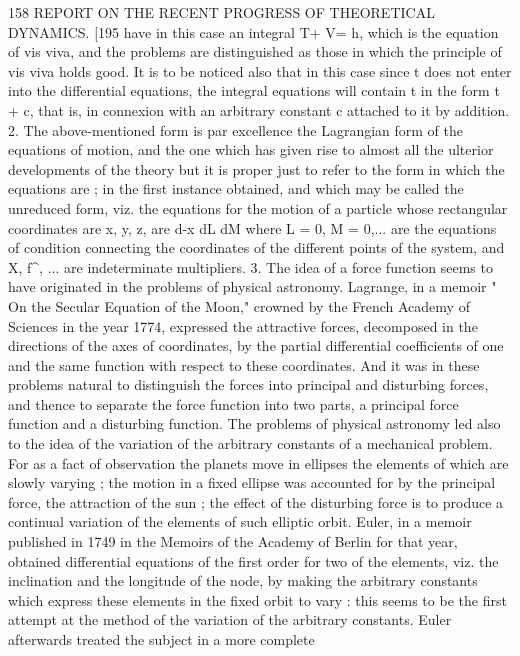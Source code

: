 \documentclass[11pt,a4paper]{book}
\begin{document}

158 REPORT ON THE RECENT PROGRESS OF THEORETICAL DYNAMICS.
[195
have in this case an integral T+ V= h, which is the equation of vis viva, and the
problems are distinguished as those in which the principle of vis viva holds good. It
is to be noticed also that in this case since t does not enter into the differential
equations, the integral equations will contain t in the form t + c, that is, in connexion
with an arbitrary constant c attached to it by addition.
2. The above-mentioned form is par excellence the Lagrangian form of the equations
of motion, and the one which has given rise to almost all the ulterior developments
of the theory but it is proper just to refer to the form in which the equations are
;
in the first instance obtained, and which may be called the unreduced form, viz. the
equations for the motion of a particle whose rectangular coordinates are x, y, z, are
d-x dL dM
where L = 0, M = 0,... are the equations of condition connecting the coordinates of the
different points of the system, and X, f^, ... are indeterminate multipliers.
3. The idea of a force function seems to have originated in the problems of
physical astronomy. Lagrange, in a memoir " On the Secular Equation of the Moon,"
crowned by the French Academy of Sciences in the year 1774, expressed the attractive
forces, decomposed in the directions of the axes of coordinates, by the partial differential
coefficients of one and the same function with respect to these coordinates. And it
was in these problems natural to distinguish the forces into principal and disturbing
forces, and thence to separate the force function into two parts, a principal force
function and a disturbing function. The problems of physical astronomy led also to
the idea of the variation of the arbitrary constants of a mechanical problem. For as
a fact of observation the planets move in ellipses the elements of which are slowly
varying ; the motion in a fixed ellipse was accounted for by the principal force, the
attraction of the sun ; the effect of the disturbing force is to produce a continual
variation of the elements of such elliptic orbit. Euler, in a memoir published in 1749
in the Memoirs of the Academy of Berlin for that year, obtained differential equations
of the first order for two of the elements, viz. the inclination and the longitude of
the node, by making the arbitrary constants which express these elements in the fixed
orbit to vary : this seems to be the first attempt at the method of the variation of
the arbitrary constants. Euler afterwards treated the subject in a more complete
\end{document}
